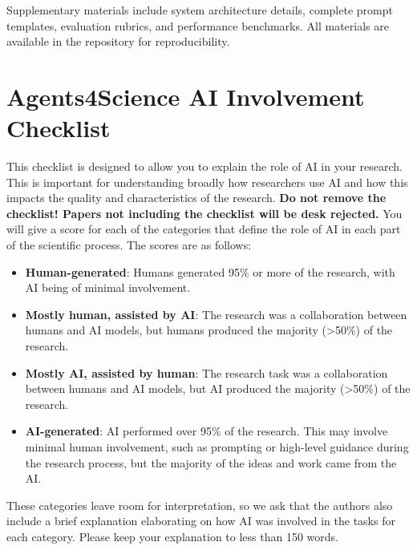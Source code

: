 \documentclass{article}
\begin{document}
Supplementary materials include system architecture details, complete prompt templates, evaluation rubrics, and performance benchmarks. All materials are available in the repository for reproducibility.


\newpage

\section*{Agents4Science AI Involvement Checklist}

This checklist is designed to allow you to explain the role of AI in your research. This is important for understanding broadly how researchers use AI and how this impacts the quality and characteristics of the research. \textbf{Do not remove the checklist! Papers not including the checklist will be desk rejected.} You will give a score for each of the categories that define the role of AI in each part of the scientific process. The scores are as follows:

\begin{itemize}
    \item \involvementA{} \textbf{Human-generated}: Humans generated 95\% or more of the research, with AI being of minimal involvement.
    \item \involvementB{} \textbf{Mostly human, assisted by AI}: The research was a collaboration between humans and AI models, but humans produced the majority (>50\%) of the research.
    \item \involvementC{} \textbf{Mostly AI, assisted by human}: The research task was a collaboration between humans and AI models, but AI produced the majority (>50\%) of the research.
    \item \involvementD{} \textbf{AI-generated}: AI performed over 95\% of the research. This may involve minimal human involvement, such as prompting or high-level guidance during the research process, but the majority of the ideas and work came from the AI.
\end{itemize}

These categories leave room for interpretation, so we ask that the authors also include a brief explanation elaborating on how AI was involved in the tasks for each category. Please keep your explanation to less than 150 words.
\end{document}
